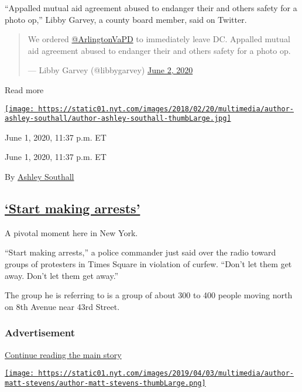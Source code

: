 ``Appalled mutual aid agreement abused to endanger their and others
safety for a photo op,'' Libby Garvey, a county board member, said on
Twitter.

\begin{quote}
We ordered
\href{https://twitter.com/ArlingtonVaPD?ref_src=twsrc\%5Etfw}{@ArlingtonVaPD}
to immediately leave DC. Appalled mutual aid agreement abused to
endanger their and others safety for a photo op.

--- Libby Garvey (@libbygarvey)
\href{https://twitter.com/libbygarvey/status/1267621740248776711?ref_src=twsrc\%5Etfw}{June
2, 2020}
\end{quote}

Read more

\href{https://www.nytimes.com/by/ashley-southall}{\texttt{[image: https://static01.nyt.com/images/2018/02/20/multimedia/author-ashley-southall/author-ashley-southall-thumbLarge.jpg]}}

June 1, 2020, 11:37 p.m. ET

June 1, 2020, 11:37 p.m. ET

By \href{https://www.nytimes.com/by/ashley-southall}{Ashley Southall}

\hypertarget{start-making-arrests}{%
\subsection{\texorpdfstring{\protect\hyperlink{start-making-arrests}{`Start
making arrests'}}{`Start making arrests'}}\label{start-making-arrests}}

A pivotal moment here in New York.

``Start making arrests,'' a police commander just said over the radio
toward groups of protesters in Times Square in violation of curfew.
``Don't let them get away. Don't let them get away.''

The group he is referring to is a group of about 300 to 400 people
moving north on 8th Avenue near 43rd Street.

\hypertarget{advertisement-3}{%
\subsubsection{Advertisement}\label{advertisement-3}}

\protect\hyperlink{after-dfp-ad-mid4}{Continue reading the main story}

\href{https://www.nytimes.com/by/matt-stevens}{\texttt{[image: https://static01.nyt.com/images/2019/04/03/multimedia/author-matt-stevens/author-matt-stevens-thumbLarge.png]}}

